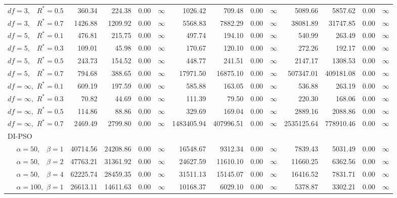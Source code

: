 \documentclass[12pt]{article}
\begin{document}
\begin{table}[ht]
{\begin{tabular}{r|rrrr|rrrr|rrrr}
  $df = 3,\enspace$ $R^* =0.5$ & 360.34 & 224.38 & 0.00 & $\infty$ & 1026.42 & 709.48 & 0.00 & $\infty$ & 5089.66 & 5857.62 & 0.00 & $\infty$ \\ 
  $df = 3,\enspace$ $R^* =0.7$ & 1426.88 & 1209.92 & 0.00 & $\infty$ & 5568.83 & 7882.29 & 0.00 & $\infty$ & 38081.89 & 31747.85 & 0.00 & $\infty$ \\ 
  $df = 5,\enspace$ $R^* =0.1$ & 476.81 & 215.75 & 0.00 & $\infty$ & 497.74 & 194.10 & 0.00 & $\infty$ & 540.99 & 263.49 & 0.00 & $\infty$ \\ 
  $df = 5,\enspace$ $R^* =0.3$ & 109.01 & 45.98 & 0.00 & $\infty$ & 170.67 & 120.10 & 0.00 & $\infty$ & 272.26 & 192.17 & 0.00 & $\infty$ \\ 
  $df = 5,\enspace$ $R^* =0.5$ & 243.73 & 154.52 & 0.00 & $\infty$ & 448.77 & 241.51 & 0.00 & $\infty$ & 2147.17 & 1308.53 & 0.00 & $\infty$ \\ 
  $df = 5,\enspace$ $R^* =0.7$ & 794.68 & 388.65 & 0.00 & $\infty$ & 17971.50 & 16875.10 & 0.00 & $\infty$ & 507347.01 & 409181.08 & 0.00 & $\infty$ \\ 
  $df = \infty,$ $R^* =0.1$ & 609.19 & 197.59 & 0.00 & $\infty$ & 585.88 & 163.05 & 0.00 & $\infty$ & 536.88 & 263.19 & 0.00 & $\infty$ \\ 
  $df = \infty,$ $R^* =0.3$ & 70.82 & 44.69 & 0.00 & $\infty$ & 111.39 & 79.50 & 0.00 & $\infty$ & 220.30 & 168.06 & 0.00 & $\infty$ \\ 
  $df = \infty,$ $R^* =0.5$ & 114.86 & 88.86 & 0.00 & $\infty$ & 329.69 & 169.04 & 0.00 & $\infty$ & 2889.16 & 2088.86 & 0.00 & $\infty$ \\ 
  $df = \infty,$ $R^* =0.7$ & 2469.49 & 2799.80 & 0.00 & $\infty$ & 1483405.94 & 407996.51 & 0.00 & $\infty$ & 2535125.64 & 778910.46 & 0.00 & $\infty$ \\ 
\hline
\multicolumn{1}{l|}{DI-PSO} &&&&&&&&&&&&\\
  $\alpha = 50,\enspace$ $\beta =1$ & 40714.56 & 24208.86 & 0.00 & $\infty$ & 16548.67 & 9312.34 & 0.00 & $\infty$ & 7839.43 & 5031.49 & 0.00 & $\infty$ \\ 
  $\alpha = 50,\enspace$ $\beta =2$ & 47763.21 & 31361.92 & 0.00 & $\infty$ & 24627.59 & 11610.10 & 0.00 & $\infty$ & 11660.25 & 6362.56 & 0.00 & $\infty$ \\ 
  $\alpha = 50,\enspace$ $\beta =4$ & 62225.74 & 28459.35 & 0.00 & $\infty$ & 31511.13 & 15145.07 & 0.00 & $\infty$ & 16416.52 & 7831.71 & 0.00 & $\infty$ \\ 
  $\alpha = 100,$ $\beta =1$ & 26613.11 & 14611.63 & 0.00 & $\infty$ & 10168.37 & 6029.10 & 0.00 & $\infty$ & 5378.87 & 3302.21 & 0.00 & $\infty$ \\ 

\end{tabular}}
\end{table}
\end{document}
